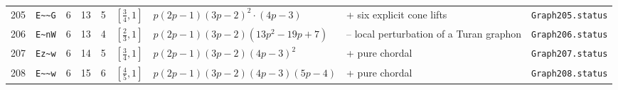 \begin{landscape}
\begin{longtable}{r l r r r l p{4.0cm} p{3.5cm} p{2.7cm}}
205 & \texttt{E\textasciitilde{}\textasciitilde{}G} & 6 & 13 & 5 & $[\frac{3}{4},1]$ & $p \left(2 p - 1\right) \left(3 p - 2\right)^{2} \cdot \left(4 p - 3\right)$ & + six explicit cone lifts & \texttt{Graph205.status}\\
206 & \texttt{E\textasciitilde{}nW} & 6 & 13 & 4 & $[\frac{2}{3},1]$ & $p \left(2 p - 1\right) \left(3 p - 2\right) \left(13 p^{2} - 19 p + 7\right)$ & -- local perturbation of a Turan graphon & \texttt{Graph206.status}\\
207 & \texttt{Ez\textasciitilde{}w} & 6 & 14 & 5 & $[\frac{3}{4},1]$ & $p \left(2 p - 1\right) \left(3 p - 2\right) \left(4 p - 3\right)^{2}$ & + pure chordal & \texttt{Graph207.status}\\
208 & \texttt{E\textasciitilde{}\textasciitilde{}w} & 6 & 15 & 6 & $[\frac{4}{5},1]$ & $p \left(2 p - 1\right) \left(3 p - 2\right) \left(4 p - 3\right) \left(5 p - 4\right)$ & + pure chordal & \texttt{Graph208.status}\\
\end{longtable}
\end{landscape}
